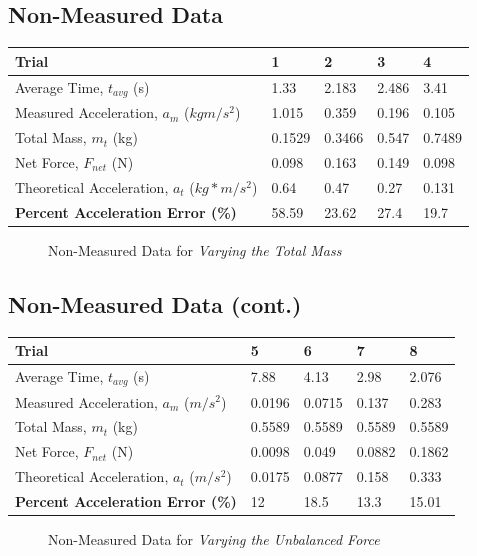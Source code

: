 \documentclass[11pt, titlepage]{article}
\begin{document}
\subsection*{Non-Measured Data}
\begin{center}
\begin{tabular}
{|m{7em}|m{7em}|m{7em}|m{7em}|m{7em}|}
\hline
Trial & 1 & 2 & 3 & 4 \\
\hline
Average Time, $t_{avg}$ (s) & 1.33 & 2.183 & 2.486 & 3.41\\
\hline
Measured Acceleration, $a_m$ ($kgm/s^2$) & 1.015 & 0.359 & 0.196 & 0.105\\
\hline
Total Mass, $m_t$ (kg) & 0.1529 & 0.3466 & 0.547 & 0.7489\\
\hline
Net Force, $F_{net}$ (N) & 0.098 & 0.163 & 0.149 & 0.098\\ 
\hline
Theoretical Acceleration, $a_t$ ($kg*m/s^2$) & 0.64 & 0.47 & 0.27 & 0.131\\
\hline
\textbf{Percent Acceleration Error (\%)} & 58.59 & 23.62 & 27.4 & 19.7\\
\hline
\end{tabular}
\begin{figure}[!ht]
\caption{Non-Measured Data for \emph{Varying the Total Mass}}
\end{figure}
\end{center}
\subsection*{Non-Measured Data (cont.)}
\begin{center}
\begin{tabular}
{|m{7em}|m{7em}|m{7em}|m{7em}|m{7em}|}
\hline
Trial & 5 & 6 & 7 & 8 \\
\hline
Average Time, $t_{avg}$ (s) & 7.88 & 4.13 & 2.98 & 2.076 \\
\hline
Measured Acceleration, $a_m$ ($m/s^2$) & 0.0196 & 0.0715 & 0.137& 0.283\\
\hline
Total Mass, $m_t$ (kg) & 0.5589 & 0.5589 & 0.5589 & 0.5589\\
\hline
Net Force, $F_{net}$ (N) & 0.0098 & 0.049 & 0.0882 & 0.1862\\ 
\hline
Theoretical Acceleration, $a_t$ ($m/s^2$) & 0.0175 & 0.0877 & 0.158 & 0.333 \\
\hline
\textbf{Percent Acceleration Error (\%)} & 12 & 18.5 & 13.3 & 15.01 \\
\hline
\end{tabular}
\begin{figure}[!ht]
\caption{Non-Measured Data for \emph{Varying the Unbalanced Force}}
\end{figure}
\end{center}
\end{document}
